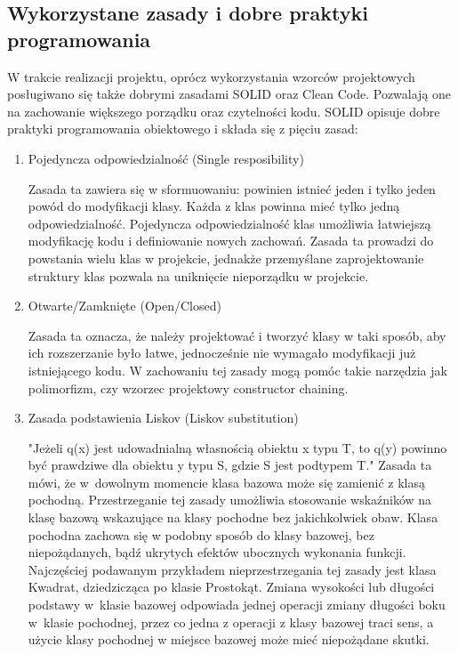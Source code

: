 \documentclass[oneside, eng]{mgr}
\begin{document}
\subsection{Wykorzystane zasady i dobre praktyki programowania}

W trakcie realizacji projektu, oprócz wykorzystania wzorców projektowych posługiwano się także dobrymi zasadami SOLID oraz Clean Code. Pozwalają one na zachowanie większego porządku oraz czytelności kodu. SOLID opisuje dobre praktyki programowania obiektowego i składa się z pięciu zasad:

\begin{enumerate}
\item Pojedyncza odpowiedzialność (Single resposibility)

Zasada ta zawiera się w sformuowaniu: powinien istnieć jeden i tylko jeden powód do modyfikacji klasy. Każda z klas powinna mieć tylko jedną odpowiedzialność. Pojedyncza odpowiedzialność klas umożliwia łatwiejszą modyfikację kodu i definiowanie nowych zachowań. Zasada ta prowadzi do powstania wielu klas w projekcie, jednakże przemyślane zaprojektowanie struktury klas pozwala na uniknięcie nieporządku w projekcie.

\item Otwarte/Zamknięte (Open/Closed)

Zasada ta oznacza, że należy projektować i tworzyć klasy w taki sposób, aby ich rozszerzanie było łatwe, jednocześnie nie wymagało modyfikacji już istniejącego kodu. W zachowaniu tej zasady mogą pomóc takie narzędzia jak polimorfizm, czy wzorzec projektowy constructor chaining.

\item Zasada podstawienia Liskov (Liskov substitution)

"Jeżeli q(x) jest udowadnialną własnością obiektu x typu T, to q(y) powinno być prawdziwe dla obiektu y typu S, gdzie S jest podtypem T." Zasada ta mówi, że w~dowolnym momencie klasa bazowa może się zamienić z klasą pochodną. Przestrzeganie tej zasady umożliwia stosowanie wskaźników na klasę bazową wskazujące na klasy pochodne bez jakichkolwiek obaw. Klasa pochodna zachowa się w podobny sposób do klasy bazowej, bez niepożądanych, bądź ukrytych efektów ubocznych wykonania funkcji. Najczęściej podawanym przykładem nieprzestrzegania tej zasady jest klasa Kwadrat, dziedzicząca po klasie Prostokąt. Zmiana wysokości lub długości podstawy w~klasie bazowej odpowiada jednej operacji zmiany długości boku w~klasie pochodnej, przez co jedna z operacji z klasy bazowej traci sens, a użycie klasy pochodnej w miejsce bazowej może mieć niepożądane skutki.


\end{enumerate}
\end{document}
